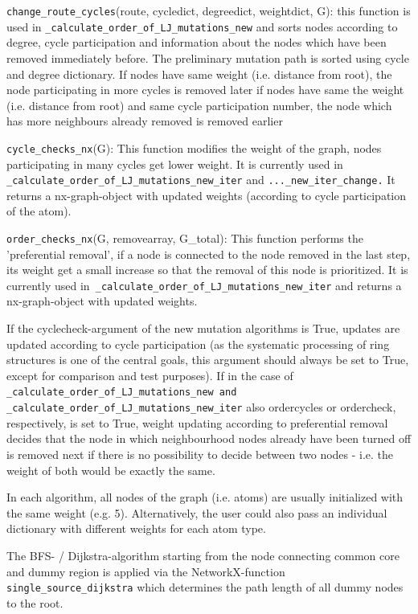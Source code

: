 \texttt{change\_route\_cycles}(route, cycledict, degreedict, weightdict,
G): this function is used in \texttt{\_calculate\_order\_of\_LJ\_mutations\_new}
and sorts nodes according to degree, cycle participation and information
about the nodes which have been removed immediately before. The preliminary mutation
path is sorted using cycle and degree dictionary. If nodes have same
weight (i.e. distance from root), the node participating in more cycles
is removed later if nodes have same the weight (i.e. distance from root)
and same cycle participation number, the node which has more neighbours
already removed is removed earlier

\texttt{cycle\_checks\_nx}(G): This function modifies the weight of
the graph, nodes participating in many cycles get lower weight. It
is currently used in 
\texttt{\_calculate\_order\_of\_LJ\_mutations\_new\_iter} and \texttt{...\_new\_iter\_change.} It returns a nx-graph-object
with updated weights (according to cycle participation of the atom).

\texttt{order\_checks\_nx}(G, removearray, G\_total): This function
performs the 'preferential removal', if a node is connected to the
node removed in the last step, its weight get a small increase so
that the removal of this node is prioritized. It is currently used
in\texttt{ \_calculate\_order\_of\_LJ\_mutations\_new\_iter} and returns
a nx-graph-object with updated weights.

If the cyclecheck-argument of the new mutation algorithms is True,
updates are updated according to cycle participation (as the systematic
processing of ring structures is one of the central goals, this argument
should always be set to True, except for comparison and test purposes).
If in the case of \texttt{\_calculate\_order\_of\_LJ\_mutations\_new
and \_calculate\_order\_of\_LJ\_mutations\_new\_iter} also ordercycles
or ordercheck, respectively, is set to True, weight updating according
to preferential removal decides that the node in which neighbourhood
nodes already have been turned off is removed next if there is no
possibility to decide between two nodes - i.e. the weight of both
would be exactly the same.

In each algorithm, all nodes of the graph (i.e. atoms) are usually
initialized with the same weight (e.g. 5). Alternatively, the user
could also pass an individual dictionary with different weights for
each atom type.

The BFS- / Dijkstra-algorithm starting from the node connecting common
core and dummy region is applied via the NetworkX-function \texttt{single\_source\_dijkstra}
which determines the path length of all dummy nodes to the root.

